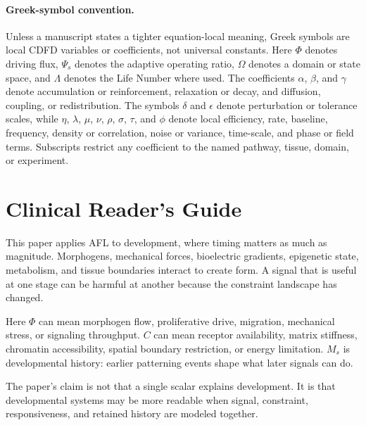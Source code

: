\documentclass[11pt]{article}
\begin{document}
\paragraph{Greek-symbol convention.}
Unless a manuscript states a tighter equation-local meaning, Greek symbols are local CDFD variables or coefficients, not universal constants. Here $\Phi$ denotes driving flux, $\Psi_s$ denotes the adaptive operating ratio, $\Omega$ denotes a domain or state space, and $\Lambda$ denotes the Life Number where used. The coefficients $\alpha$, $\beta$, and $\gamma$ denote accumulation or reinforcement, relaxation or decay, and diffusion, coupling, or redistribution. The symbols $\delta$ and $\epsilon$ denote perturbation or tolerance scales, while $\eta$, $\lambda$, $\mu$, $\nu$, $\rho$, $\sigma$, $\tau$, and $\phi$ denote local efficiency, rate, baseline, frequency, density or correlation, noise or variance, time-scale, and phase or field terms. Subscripts restrict any coefficient to the named pathway, tissue, domain, or experiment.

\section*{Clinical Reader's Guide}
This paper applies AFL to development, where timing matters as much as magnitude. Morphogens, mechanical forces, bioelectric gradients, epigenetic state, metabolism, and tissue boundaries interact to create form. A signal that is useful at one stage can be harmful at another because the constraint landscape has changed.

Here $\Phi$ can mean morphogen flow, proliferative drive, migration, mechanical stress, or signaling throughput. $C$ can mean receptor availability, matrix stiffness, chromatin accessibility, spatial boundary restriction, or energy limitation. $M_s$ is developmental history: earlier patterning events shape what later signals can do.

The paper's claim is not that a single scalar explains development. It is that developmental systems may be more readable when signal, constraint, responsiveness, and retained history are modeled together.


\vspace{0.5em}\noindent{}
\vspace{0.75em}
\end{document}
